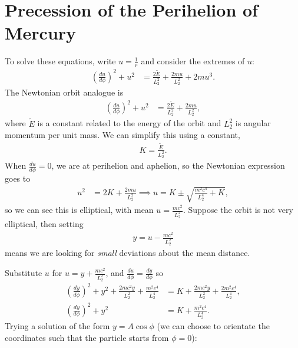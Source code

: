 \documentclass[a4paper, 11pt, normalem]{report}
\begin{document}
\section{Precession of the Perihelion of Mercury}
To solve these equations, write $u=\frac1r$ and consider the extremes of $u$:
\begin{align}
    \left(\frac{du}{d\phi}\right)^2 + u^2 &= \frac{2\tilde{E}}{L_2^2} + \frac{2mu}{L_2^2} + 2mu^3.
\end{align}
The Newtonian orbit analogue is
\begin{align}
    \left(\frac{du}{d\phi}\right)^2 + u^2 &= \frac{2\tilde{E}}{L_2^2} + \frac{2mu}{L_2^2},
\end{align}
where $\tilde{E}$ is a constant related to the energy of the orbit and $L_2^2$ is angular momentum per unit mass. 
We can simplify this using a constant,
\begin{align}
    K = \frac{\tilde{E}}{L_2^2}.
\end{align}
When $\frac{du}{d\phi}=0$, we are at perihelion and aphelion, so the Newtonian expression goes to
\begin{align}
    u^2 &= 2K + \frac{2mu}{L_2^2} \implies u = K \pm \sqrt{\frac{m^2c^4}{L_2^4}+K},
\end{align}
so we can see this is elliptical, with mean $u=\frac{mc^2}{L_2^2}$.
Suppose the orbit is not very elliptical, then setting
\begin{align}
    y = u - \frac{mc^2}{L_2^2}
\end{align}
means we are looking for \emph{small} deviations about the mean distance.
\begin{figure}[H]
    \centering
\end{figure}
Substitute $u$ for $u = y+\frac{mc^2}{L_2^2}$, and $\frac{du}{d\phi} = \frac{dy}{d\phi}$ so
\begin{align}
    \left(\frac{dy}{d\phi}\right)^2 + y^2 + \frac{2mc^2y}{L_2^2} + \frac{m^2c^4}{L_2^4} &= K + \frac{2mc^2y}{L_2^2} + \frac{2m^2c^4}{L_2^4}, \\
    \left(\frac{dy}{d\phi}\right)^2 + y^2 &= K + \frac{m^2c^4}{L_2^4}. 
\end{align}
Trying a solution of the form $y=A\cos\phi$ (we can choose to orientate the coordinates such that the particle starts from $\phi=0$):
\end{document}
